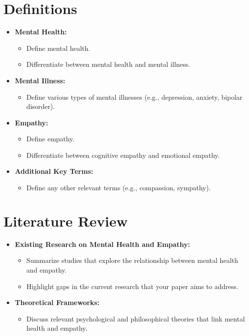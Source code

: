 \documentclass[stu]{apa7}
\begin{document}
\section{Definitions}
\begin{itemize}
    \item \textbf{Mental Health:}
        \begin{itemize}
            \item Define mental health.
            \item Differentiate between mental health and mental illness.
        \end{itemize}
    \item \textbf{Mental Illness:}
        \begin{itemize}
            \item Define various types of mental illnesses (e.g., depression, anxiety, bipolar disorder).
        \end{itemize}
    \item \textbf{Empathy:}
        \begin{itemize}
            \item Define empathy.
            \item Differentiate between cognitive empathy and emotional empathy.
        \end{itemize}
    \item \textbf{Additional Key Terms:}
        \begin{itemize}
            \item Define any other relevant terms (e.g., compassion, sympathy).
        \end{itemize}
\end{itemize}

\section{Literature Review}
\begin{itemize}
    \item \textbf{Existing Research on Mental Health and Empathy:}
        \begin{itemize}
            \item Summarize studies that explore the relationship between mental health and empathy.
            \item Highlight gaps in the current research that your paper aims to address.
        \end{itemize}
    \item \textbf{Theoretical Frameworks:}
        \begin{itemize}
            \item Discuss relevant psychological and philosophical theories that link mental health and empathy.
        \end{itemize}
\end{itemize}
\end{document}

